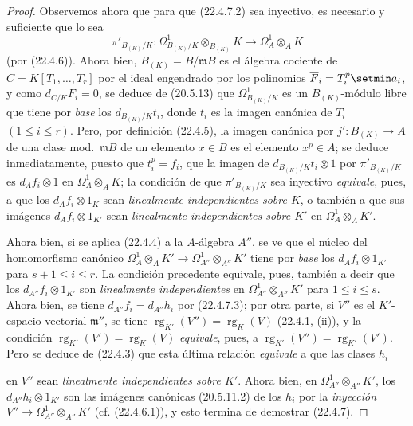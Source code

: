 \begin{proof}
Observemos ahora que para que (22.4.7.2) sea inyectivo, es necesario y suficiente
que lo sea
\[
  \pi'_{B_{(K)}/K}:\Omega^1_{B_{(K)}/K}\otimes_{B_{(K)}}K
  \longrightarrow\Omega^1_A\otimes_AK
\]
(por (22.4.6)). Ahora bien, $B_{(K)}=B/\mathfrak mB$ es el álgebra cociente de
$C=K[T_1,\ldots,T_r]$ por el ideal engendrado por los polinomios
$\overline F_i=T_i^p\setmin a_i$, y como $d_{C/K}\overline F_i=0$, se deduce de
(20.5.13) que $\Omega^1_{B_{(K)}/K}$ es un $B_{(K)}$-módulo libre que tiene por
\emph{base} los $d_{B_{(K)}/K}t_i$, donde $t_i$ es la imagen canónica de $T_i$
$(1\leqslant i\leqslant r)$. Pero, por definición (22.4.5), la imagen canónica por
$j':B_{(K)}\longrightarrow A$ de una clase mod.~$\mathfrak mB$ de un elemento
$x\in B$ es el elemento $x^p\in A$; se deduce inmediatamente, puesto que $t_i^p=f_i$,
que la imagen de $d_{B_{(K)}/K}t_i\otimes1$ por $\pi'_{B_{(K)}/K}$ es
$d_Af_i\otimes1$ en $\Omega^1_A\otimes_AK$; la condición de que
$\pi'_{B_{(K)}/K}$ sea inyectivo \emph{equivale}, pues, a que los
$d_Af_i\otimes1_K$ sean \emph{linealmente independientes sobre $K$}, o también
a que sus imágenes $d_Af_i\otimes1_{K'}$ sean \emph{linealmente independientes
sobre $K'$} en $\Omega^1_A\otimes_AK'$.

Ahora bien, si se aplica (22.4.4) a la $A$-álgebra $A''$, se ve que el núcleo del
homomorfismo canónico
$\Omega^1_A\otimes_AK'\longrightarrow\Omega^1_{A''}\otimes_{A''}K'$ tiene por
\emph{base} los $d_Af_i\otimes1_{K'}$ para $s+1\leqslant i\leqslant r$. La condición
precedente equivale, pues, también a decir que los $d_{A''}f_i\otimes1_{K'}$ son
\emph{linealmente independientes} en $\Omega^1_{A''}\otimes_{A''}K'$ para
$1\leqslant i\leqslant s$. Ahora bien, se tiene $d_{A''}f_i=d_{A''}h_i$ por (22.4.7.3);
por otra parte, si $V''$ es el $K'$-espacio vectorial $\mathfrak m''$, se tiene
$\operatorname{rg}_{K'}(V'')=\operatorname{rg}_K(V)$ (22.4.1, (ii)), y la condición
$\operatorname{rg}_{K'}(V')=\operatorname{rg}_K(V)$ \emph{equivale}, pues, a
$\operatorname{rg}_{K'}(V'')=\operatorname{rg}_{K'}(V')$. Pero se deduce de (22.4.3) que esta última
relación \emph{equivale} a que las clases $h_i$


en $V''$ sean \emph{linealmente independientes sobre $K'$}. Ahora bien, en
$\Omega^1_{A''}\otimes_{A''}K'$, los $d_{A''}h_i\otimes1_{K'}$ son las imágenes
canónicas (20.5.11.2) de los $h_i$ por la \emph{inyección}
$V''\longrightarrow\Omega^1_{A''}\otimes_{A''}K'$ (cf. (22.4.6.1)), y esto
termina de demostrar (22.4.7).
\end{proof}


